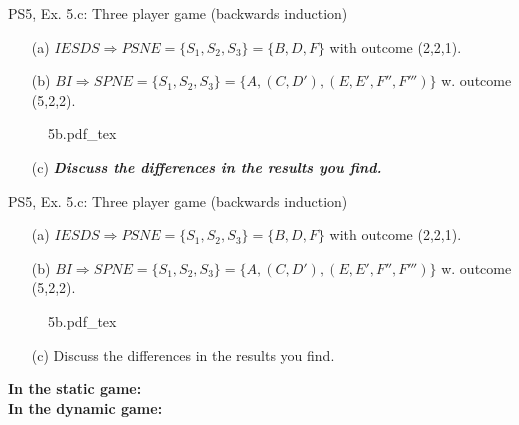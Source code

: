 \begin{frame}{PS5, Ex. 5.c: Three player game (backwards induction)}
    \begin{itemize}
      \item[(a)] $IESDS \Rightarrow PSNE=\{S_1,S_2,S_3\}=\{B,D,F\}$ with outcome (2,2,1).
      \item[(b)] $BI \Rightarrow SPNE=\{S_1,S_2,S_3\}=\{A,(C,D'),(E,E',F'',F''')\}$ w. outcome (5,2,2).
    \end{itemize}
    \vspace{-10pt}
    \begin{figure}[!h]
      \center
      \def\svgwidth{\columnwidth}
      {5b.pdf_tex}
    \end{figure}
    \begin{itemize}
      \item[(c)] \textbf{\textit{Discuss the differences in the results you find.}}
    \end{itemize}
  \vfill\null
\end{frame}
\begin{frame}{PS5, Ex. 5.c: Three player game (backwards induction)}
    \begin{itemize}
      \item[(a)] $IESDS \Rightarrow PSNE=\{S_1,S_2,S_3\}=\{B,D,F\}$ with outcome (2,2,1).
      \item[(b)] $BI \Rightarrow SPNE=\{S_1,S_2,S_3\}=\{A,(C,D'),(E,E',F'',F''')\}$ w. outcome (5,2,2).
    \end{itemize}
    \vspace{-6pt}
    \begin{figure}[!h]
      \center
      \def\svgwidth{\columnwidth}
      {5b.pdf_tex}
    \end{figure}
    \begin{itemize}
      \item[(c)] Discuss the differences in the results you find.
    \end{itemize}
    \textbf{In the static game:} \\\medskip
    \textbf{In the dynamic game:} 
  \vfill\null
\end{frame}




